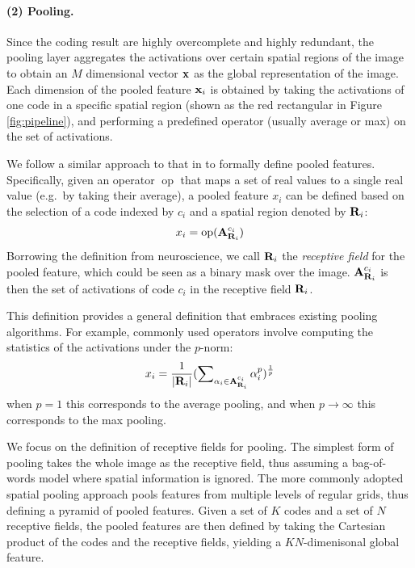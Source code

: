 \paragraph{(2) Pooling.} Since the coding result are highly overcomplete and highly redundant, the pooling layer aggregates the activations over certain spatial regions of the image to obtain an $M$ dimensional vector $\mathbf{x}$ as the global representation of the image. Each dimension of the pooled feature $\mathbf{x}_i$ is obtained by taking the activations of one code in a specific spatial region (shown as the red rectangular in Figure \ref{fig:pipeline}), and performing a predefined operator (usually average or max) on the set of activations. 

We follow a similar approach to that in \cite{Boureau:2011tz} to formally define pooled features. Specifically, given an operator $\operatorname{op}$ that maps a set of real values to a single real value (e.g.\ by taking their average), a pooled feature $x_i$ can be defined based on the selection of a code indexed by $c_i$ and a spatial region denoted by $\mathbf{R}_{i}$:
\begin{equation}
  x_i = \operatorname{op} (\mathbf{A}^{c_i}_{\mathbf{R}_{i}})
\end{equation}
Borrowing the definition from neuroscience, we call $\mathbf{R}_i$ the \emph{receptive field} for the pooled feature, which could be seen as a binary mask over the image. $\mathbf{A}^{c_i}_{\mathbf{R}_{i}}$ is then the set of activations of code $c_i$ in the receptive field $\mathbf{R}_i$.

This definition provides a general definition that embraces existing pooling algorithms. For example, commonly used operators involve computing the statistics of the activations under the $p$-norm:
\begin{equation}
  x_i = \frac{1}{|\mathbf{R}_{i}|}(\sum\nolimits_{\alpha_i \in \mathbf{A}^{c_i}_{\mathbf{R}_{i}}} \alpha_i^{p})^{\frac{1}{p}}
\end{equation}
when $p=1$ this corresponds to the average pooling, and when $p\rightarrow \infty$ this corresponds to the max pooling.

We focus on the definition of receptive fields for pooling. The simplest form of pooling takes the whole image as the receptive field, thus assuming a bag-of-words model where spatial information is ignored. The more commonly adopted spatial pooling approach \cite{lazebnik2006beyond,Yang:2009vb} pools features from multiple levels of regular grids, thus defining a pyramid of pooled features. Given a set of $K$ codes and a set of $N$ receptive fields, the pooled features are then defined by taking the Cartesian product of the codes and the receptive fields, yielding a $KN$-dimenisonal global feature.


